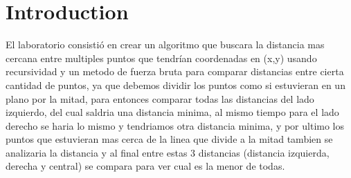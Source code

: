 \section{Introduction} 
El laboratorio consistió en crear un algoritmo que buscara la distancia mas cercana entre multiples puntos que tendrían coordenadas en (x,y) usando recursividad y un metodo de fuerza bruta para comparar distancias entre cierta cantidad de puntos, ya que debemos dividir los puntos como si estuvieran en un plano por la mitad, para entonces comparar todas las distancias del lado izquierdo, del cual saldria una distancia minima, al mismo tiempo para el lado derecho se haria lo mismo y tendriamos otra distancia minima, y por ultimo los puntos que estuvieran mas cerca de la linea que divide a la mitad tambien se analizaria la distancia y al final entre estas 3 distancias (distancia izquierda, derecha y central) se compara para ver cual es la menor de todas.
